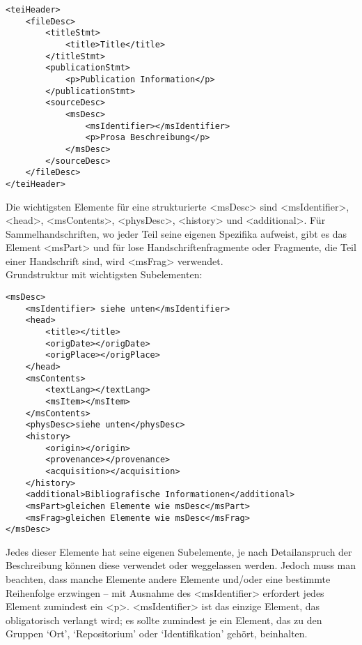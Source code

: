 \documentclass{article}
\begin{document}
        \begin{verbatim}<teiHeader>
    <fileDesc>
        <titleStmt>
            <title>Title</title>
        </titleStmt>
        <publicationStmt>
            <p>Publication Information</p>
        </publicationStmt>
        <sourceDesc>
            <msDesc>
                <msIdentifier></msIdentifier>
                <p>Prosa Beschreibung</p>
            </msDesc>
        </sourceDesc>
    </fileDesc>
</teiHeader>\end{verbatim}Die wichtigsten Elemente für eine strukturierte <msDesc> sind
                     <msIdentifier>, <head>,
                     <msContents>, <physDesc>,
                     <history> und <additional>. Für
                  Sammelhandschriften, wo jeder Teil seine eigenen Spezifika aufweist, gibt es das
                  Element <msPart> und für lose Handschriftenfragmente oder
                  Fragmente, die Teil einer Handschrift sind, wird <msFrag>
                  verwendet. \\
            
        Grundstruktur mit wichtigsten Subelementen:\\
            
        \begin{verbatim}<msDesc>
    <msIdentifier> siehe unten</msIdentifier>
    <head>
        <title></title>
        <origDate></origDate>
        <origPlace></origPlace>
    </head>
    <msContents>
        <textLang></textLang>
        <msItem></msItem>
    </msContents>
    <physDesc>siehe unten</physDesc>
    <history>
        <origin></origin>
        <provenance></provenance>
        <acquisition></acquisition>
    </history>
    <additional>Bibliografische Informationen</additional>
    <msPart>gleichen Elemente wie msDesc</msPart>
    <msFrag>gleichen Elemente wie msDesc</msFrag>
</msDesc>\end{verbatim}Jedes dieser Elemente hat seine eigenen Subelemente, je nach Detailanspruch der
                  Beschreibung können diese verwendet oder weggelassen werden. Jedoch muss man
                  beachten, dass manche Elemente andere Elemente und/oder eine bestimmte Reihenfolge
                  erzwingen – mit Ausnahme des <msIdentifier> erfordert jedes
                  Element zumindest ein <p>. <msIdentifier>
                  ist das einzige Element, das obligatorisch verlangt wird; es sollte zumindest je
                  ein Element, das zu den Gruppen ‘Ort’, ‘Repositorium’ oder ‘Identifikation’
                  gehört, beinhalten.\\
            
\end{document}
